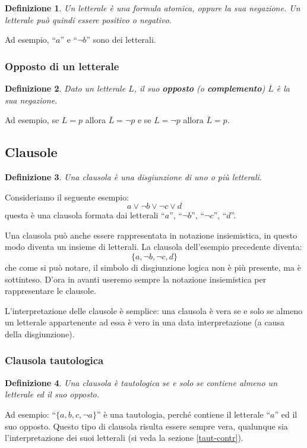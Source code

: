 \documentclass[a4paper,12pt]{report}
\newtheorem{definition}{Definizione}[section]
\begin{document}
\begin{definition}
    Un letterale è una formula atomica, oppure la sua negazione. Un letterale può quindi essere positivo o negativo.
\end{definition}
Ad esempio, ``$a$'' e ``$\lnot b$'' sono dei letterali.

\subsubsection{Opposto di un letterale}
\begin{definition}
    Dato un letterale $L$, il suo \textbf{opposto} (o \textbf{complemento}) $\overline{L}$ è la sua negazione.
\end{definition}
Ad esempio, se $L = p$ allora $\overline{L} = \lnot p$ e se $L = \lnot p$ allora $\overline{L} = p$.

\subsection{Clausole}
\begin{definition}
    Una clausola è una disgiunzione di uno o più letterali.
\end{definition}
Consideriamo il seguente esempio:
\[ a \lor \lnot b \lor \lnot c \lor d \] 
questa è una clausola formata dai letterali ``$a$'', ``$\lnot b$'', ``$\lnot c$'', ``$d$''.

Una clausola può anche essere rappresentata in notazione insiemistica, in questo modo diventa un insieme di letterali. La clausola dell'esempio precedente diventa:
\[ \{a, \lnot b, \lnot c, d\}\]
che come si può notare, il simbolo di disgiunzione logica non è più presente, ma è sottinteso. D'ora in avanti useremo sempre la notazione insiemistica per rappresentare le clausole.

L'interpretazione delle clausole è semplice: una clausola è vera se e solo se almeno un letterale appartenente ad essa è vero in una data interpretazione (a causa della disgiunzione).

\subsubsection{Clausola tautologica}
\begin{definition}
    Una clausola è tautologica se e solo se contiene almeno un letterale ed il suo opposto.
\end{definition}
Ad esempio: ``$\{ a, b, c, \lnot a \}$'' è una tautologia, perché contiene il letterale ``$a$'' ed il suo opposto. Questo tipo di clausola risulta essere sempre vera, qualunque sia l'interpretazione dei suoi letterali (si veda la sezione \ref{taut-contr}).
\end{document}
